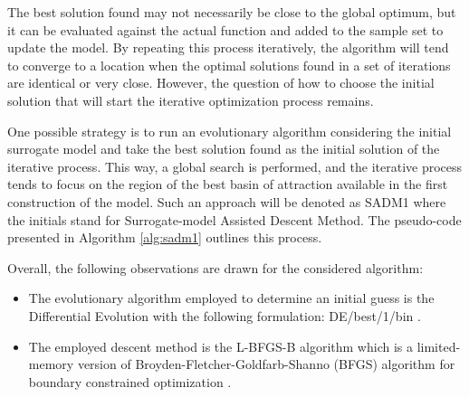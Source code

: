 				The best solution found may not necessarily be close to the global optimum, but it can be evaluated against the actual function and added to the sample set to update the model. By repeating this process iteratively, the algorithm will tend to converge to a location when the optimal solutions found in a set of iterations are identical or very close. However, the question of how to choose the initial solution that will start the iterative optimization process remains.
				
				One possible strategy is to run an evolutionary algorithm considering the initial surrogate model and take the best solution found as the initial solution of the iterative process. This way, a global search is performed, and the iterative process tends to focus on the region of the best basin of attraction available in the first construction of the model. Such an approach will be denoted as SADM1 where the initials stand for Surrogate-model Assisted Descent Method. The pseudo-code presented in Algorithm \ref{alg:sadm1} outlines this process.
				
				Overall, the following observations are drawn for the considered algorithm:
				\begin{itemize}
					\item The evolutionary algorithm employed to determine an initial guess is the Differential Evolution with the following formulation: DE/best/1/bin \citep{rocca2011differential}.
					\item The employed descent method is the L-BFGS-B algorithm which is a limited-memory version of Broyden-Fletcher-Goldfarb-Shanno (BFGS) algorithm for boundary constrained optimization \citep{byrd1995limited,zhu1997algorithm}.
				\end{itemize}
				
